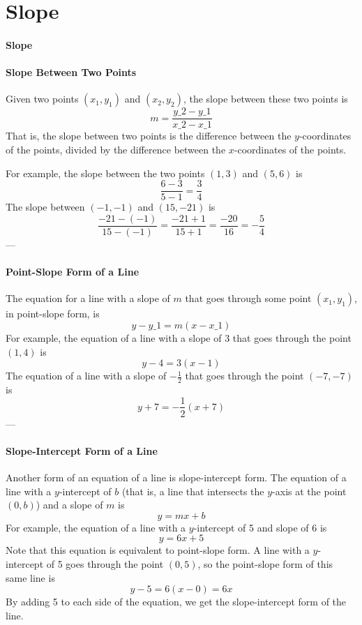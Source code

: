 \section{Slope}
\label{sec:slope}

\paragraph{Slope}

\paragraph{Slope Between Two Points}

Given two points $(x_1, y_1)$ and $(x_2, y_2)$, the slope between these two points is
$$
m = \frac{y\_2 - y\_1}{x\_2 - x\_1}
$$
That is, the slope between two points is the difference between the $y$-coordinates of the points, divided by the difference between the $x$-coordinates of the points. 

For example, the slope between the two points $(1, 3)$ and $(5, 6)$ is
$$
\frac{6 - 3}{5 - 1} = \frac{3}{4}
$$
The slope between $(-1, -1)$ and $(15, -21)$ is
$$
\frac{-21 - (-1)}{15 - (-1)} = \frac{-21 + 1}{15 + 1} = \frac{-20}{16} = -\frac{5}{4}
$$
---

\paragraph{Point-Slope Form of a Line}

The equation for a line with a slope of $m$ that goes through some point $(x_1, y_1)$, in point-slope form, is
$$
y - y\_1 = m (x - x\_1)
$$
For example, the equation of a line with a slope of 3 that goes through the point $(1, 4)$ is
$$
y - 4 = 3 (x - 1)
$$
The equation of a line with a slope of $-\frac{1}{2}$ that goes through the point $(-7, -7)$ is
$$
y + 7 = -\frac{1}{2} (x + 7)
$$
---

\paragraph{Slope-Intercept Form of a Line}

Another form of an equation of a line is slope-intercept form. The equation of a line with a $y$-intercept of $b$ (that is, a line that intersects the $y$-axis at the point $(0, b)$) and a slope of $m$ is
$$
y = mx + b
$$
For example, the equation of a line with a $y$-intercept of 5 and slope of 6 is
$$
y = 6x + 5
$$
Note that this equation is equivalent to point-slope form. A line with a $y$-intercept of 5 goes through the point $(0, 5)$, so the point-slope form of this same line is
$$
y - 5 = 6 (x - 0) = 6x
$$
By adding 5 to each side of the equation, we get the slope-intercept form of the line.

